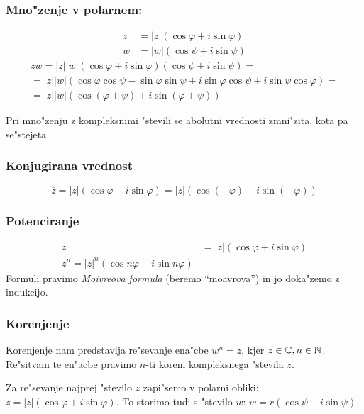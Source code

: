 \subsubsection*{Mno"zenje v polarnem:}
\begin{align*}
z &= |z|(\cos \varphi + i \sin \varphi)\\
w &= |w|(\cos \psi + i \sin \psi)
\end{align*}
%
\begin{multline*}
zw = |z||w|(\cos \varphi + i \sin \varphi)(\cos \psi + i \sin \psi) =\\
= |z||w|(\cos \varphi \cos \psi - \sin \varphi \sin \psi + i\sin \varphi \cos \psi + i \sin \psi \cos \varphi) =\\
= |z||w|(\cos (\varphi + \psi) + i \sin (\varphi + \psi))
\end{multline*}

Pri mno"zenju z kompleksnimi "stevili se abolutni vrednosti zmni"zita, kota pa se"stejeta

\subsubsection*{Konjugirana vrednost}
\begin{equation*}
\overline{z} = |z|(\cos\varphi - i \sin \varphi) = |z|(\cos (-\varphi) + i \sin (- \varphi))
\end{equation*}

\subsubsection*{Potenciranje}
\begin{align*}
z &= |z|(\cos \varphi + i \sin \varphi)\\
z^n = |z|^n(\cos n \varphi + i \sin n \varphi)
\end{align*}
Formuli pravimo \emph{Moivreova formula} (beremo ``moavrova'') in jo doka"zemo z indukcijo.

\subsubsection*{Korenjenje}
Korenjenje nam predstavlja re"sevanje ena"cbe $w^n = z$, kjer $z \in \mathbb{C}, n \in \mathbb{N}$. Re"sitvam te en"acbe pravimo $n$-ti koreni kompleksnega "stevila $z$.

Za re"sevanje najprej "stevilo $z$ zapi"semo v polarni obliki: $z = |z|(\cos \varphi + i \sin \varphi)$. To storimo tudi s "stevilo $w$: $w = r (\cos \psi + i \sin \psi)$.

